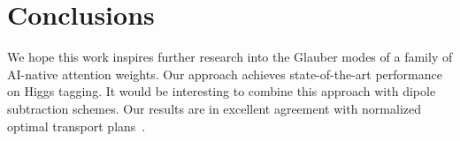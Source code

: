 \section{Conclusions}\label{sec:conclusions}

We hope this work inspires further research into the Glauber modes of a
family of AI-native attention weights. Our approach achieves
state-of-the-art performance on Higgs tagging. It would be interesting
to combine this approach with dipole subtraction schemes. Our results
are in excellent agreement with normalized optimal transport
plans~\cite{TPC:0469-Foundation-Models-for-Polylogarithms-Resummation-Meets-Machine-Learning-September-26-2026}.

